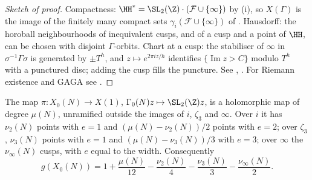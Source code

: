 \begin{proof}[Sketch of proof]
Compactness: $\HH^*=\SL_2(\Z)\cdot(\mathcal F\cup\{\infty\})$ by (i), so $X(\Gamma)$ is the image of the finitely many compact sets
$\gamma_i(\mathcal F\cup\{\infty\})$ of . Hausdorff: the horoball neighbourhoods of inequivalent cusps, and of a cusp and a point of $\HH$,
can be chosen with disjoint $\Gamma$-orbits. Chart at a cusp: the stabiliser of $\infty$ in $\sigma^{-1}\Gamma\sigma$ is generated by $\pm T^h$, and $z\mapsto e^{2\pi iz/h}$ identifies
$\{\operatorname{Im}z>C\}$ modulo $T^h$ with a punctured disc; adding the cusp fills the puncture. See \cite[Section 2.4]{DiamondShurman}, \cite[Section 1.5]{Shimura71}. For
Riemann existence and GAGA see .
\end{proof}

\begin{theorem}\label{thm:modforms:genus-formula}
The map $\pi\colon X_0(N)\to X(1)$, $\Gamma_0(N)z\mapsto\SL_2(\Z)z$, is a holomorphic map of degree $\mu(N)$, unramified outside the images of $i$, $\zeta_3$ and $\infty$. Over $i$ it
has $\nu_2(N)$ points with $e=1$ and $(\mu(N)-\nu_2(N))/2$ points with $e=2$; over $\zeta_3$, $\nu_3(N)$ points with $e=1$ and $(\mu(N)-\nu_3(N))/3$ with $e=3$; over $\infty$ the
$\nu_\infty(N)$ cusps, with $e$ equal to the width. Consequently
\[
g(X_0(N))=1+\frac{\mu(N)}{12}-\frac{\nu_2(N)}4-\frac{\nu_3(N)}3-\frac{\nu_\infty(N)}2.
\]
\end{theorem}

